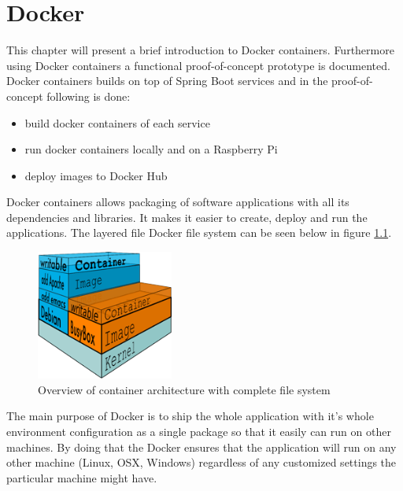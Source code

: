 \chapter{Docker}\label{ch:docker}
This chapter will present a brief introduction to Docker containers.
Furthermore using Docker containers a functional proof-of-concept prototype is documented. Docker containers builds on top of Spring Boot services and in the proof-of-concept following is done:


\begin{itemize}
\item build docker containers of each service 
\item run docker containers locally and on a Raspberry Pi
\item deploy images to Docker Hub
\end{itemize}


Docker containers allows packaging of software applications with all its dependencies and libraries. It makes it easier to create, deploy and run the applications. The layered file Docker file system can be seen below in figure \ref{fig:filesystem}.

\begin{figure}[bth]
  \centering

      \includegraphics[width=0.4\textwidth]{gfx/what_is_layered_filesystems_sm}
  \caption{Overview of container architecture with complete file system }
  \label{fig:filesystem}
  
\end{figure}




The main purpose of Docker is to ship the whole application with it's whole environment configuration as a single package so that it easily can run on other machines. 
By doing that the Docker ensures that the application will run on any other machine (Linux, OSX, Windows) regardless of any customized settings the particular machine might have.


